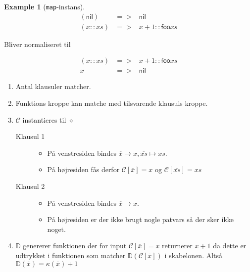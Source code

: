 \documentclass[oneside]{memoir}
\theoremstyle{definition}
\newtheorem{example}{Example}
\begin{document}
\begin{example}[\texttt{map}-instans]

  \begin{eqnarray*}
    (\mathsf{nil}) &=>& \mathsf{nil} \\
    (x::xs) &=>& x+1 :: \mathsf{foo} xs
  \end{eqnarray*}
  
  Bliver normaliseret til 

  \begin{eqnarray*}
    (x::xs) &=>& x+1 :: \mathsf{foo} xs \\
    x &=>& \mathsf{nil}
  \end{eqnarray*}

  \begin{enumerate}
  \item Antal klausuler matcher.
    
  \item Funktions kroppe kan matche med tilsvarende klausuls kroppe.
    
  \item $\mathcal{C}$ instantieres til $\diamond$
    
    \begin{description}
    \item[Klausul 1] 
      \begin{itemize}
      \item På venstresiden bindes $\overline{x} \mapsto x, \overline{xs} \mapsto xs$.
        
      \item På højresiden fås derfor $\mathcal{C}[\overline{x}] = x$ og
        $\mathcal{C}[\overline{xs}] = xs$        
      \end{itemize}
        
      
    \item[Klausul 2]
      \begin{itemize}
      \item På venstresiden bindes $\overline{x} \mapsto
        x$.
        
      \item På højresiden er der ikke brugt nogle patvars så der sker ikke
        noget.
      \end{itemize}
      
    \end{description}
      
  \item $\mathbb{D}$ genererer funktionen der for input
    $\mathcal{C}[\overline{x}] = x$ returnerer $x + 1$ da dette er udtrykket i
    funktionen som matcher $\mathbb{D}\left( \mathcal{C}[\overline{x}] \right)$
    i skabelonen. Altså $\mathbb{D}(\overline{x}) = \kappa(\overline{x}) + 1$ 
  \end{enumerate}


\end{example}
\end{document}
